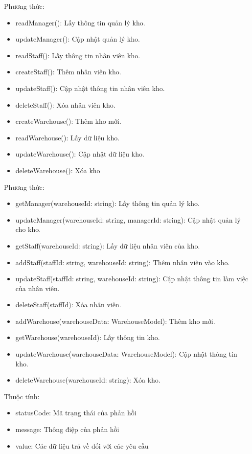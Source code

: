 Phương thức:
\begin{itemize}
	\item readManager(): Lấy thông tin quản lý kho.
	\item updateManager(): Cập nhật quản lý kho.
	\item readStaff(): Lấy thông tin nhân viên kho.
	\item createStaff(): Thêm nhân viên kho.
	\item updateStaff(): Cập nhật thông tin nhân viên kho.
	\item deleteStaff(): Xóa nhân viên kho.
	\item createWarehouse(): Thêm kho mới.
	\item readWarehouse(): Lấy dữ liệu kho.
	\item updateWarehouse(): Cập nhật dữ liệu kho.
	\item deleteWarehouse(): Xóa kho
\end{itemize}

Phương thức:
\begin{itemize}
	\item getManager(warehouseId: string): Lấy thông tin quản lý kho.
	\item updateManager(warehouseId: string, managerId: string): Cập nhật quản lý cho kho.
	\item getStaff(warehouseId: string): Lấy dữ liệu nhân viên của kho.
	\item addStaff(staffId: string, warehouseId: string): Thêm nhân viên vào kho.
	\item updateStaff(staffId: string, warehouseId: string): Cập nhật thông tin làm việc của nhân viên.
	\item deleteStaff(staffId): Xóa nhân viên.
	\item addWarehouse(warehouseData: WarehouseModel): Thêm kho mới.
	\item getWarehouse(warehouseId): Lấy thông tin kho.
	\item updateWarehouse(warehouseData: WarehouseModel): Cập nhật thông tin kho.
	\item deleteWarehouse(warehouseId: string): Xóa kho.
\end{itemize}

Thuộc tính:
\begin{itemize}
	\item statusCode: Mã trạng thái của phản hồi
	\item message: Thông điệp của phản hồi
	\item value: Các dữ liệu trả về đối với các yêu cầu
\end{itemize}

